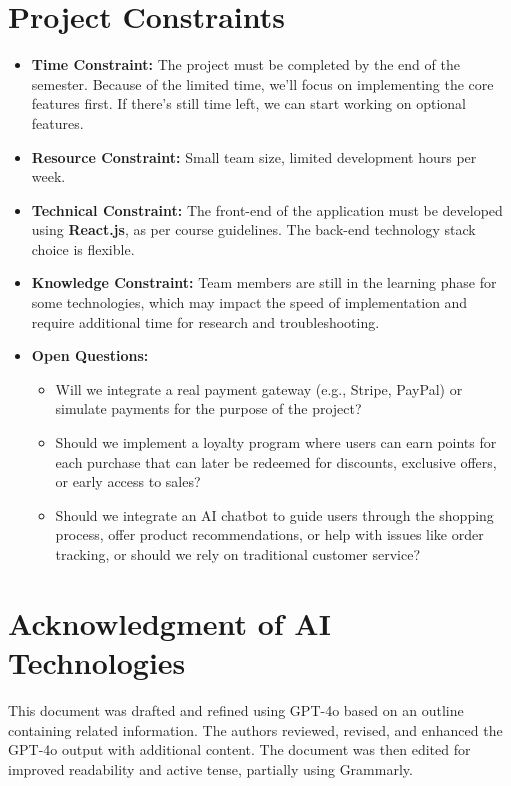\documentclass[12pt]{article}
\begin{document}
\section{Project Constraints}\label{sec:project-constraints}
\begin{itemize}
	\item \textbf{Time Constraint:}  The project must be completed by the end of the semester.
	Because of the limited time, we'll focus on implementing the core features first.
	If there's still time left, we can start working on optional features.
	\item \textbf{Resource Constraint:} Small team size, limited development hours per week.
	\item \textbf{Technical Constraint:} The front-end of the application must be developed using
	\textbf{React.js}, as per course guidelines.
	The back-end technology stack choice is flexible.
	\item \textbf{Knowledge Constraint:} Team members are still in the learning phase for some
	technologies, which may impact the speed of implementation and require additional time for
	research and troubleshooting.
	\item \textbf{Open Questions:}
	\begin{itemize}
		\item Will we integrate a real payment gateway (e.g., Stripe, PayPal) or simulate payments
		for the purpose of the project?
		\item Should we implement a loyalty program where users can earn points for each purchase
		that can later be redeemed for discounts, exclusive offers, or early access to sales?
		\item Should we integrate an AI chatbot to guide users through the shopping process, offer
		product recommendations, or help with issues like order tracking, or should we rely on
		traditional customer service?
	\end{itemize}
\end{itemize}

\section{Acknowledgment of AI Technologies}\label{sec:acknowledgment-of-ai-technologies}
This document was drafted and refined using GPT-4o based on an outline containing related information.
The authors reviewed, revised, and enhanced the GPT-4o output with additional content.
The document was then edited for improved readability and active tense, partially using Grammarly.
\end{document}
